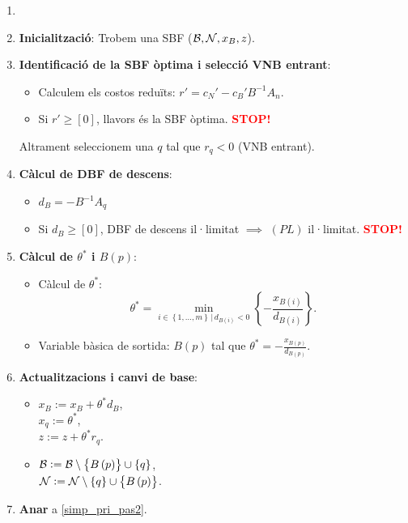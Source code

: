 \begin{alg}
    \begin{enumerate}
        \item[]
        \item {\bf Inicialització}: Trobem una SBF ($\mathcal{B}, \mathcal{N}, x_B, z$).
        \item \label{simp_pri_pas2} {\bf Identificació de la SBF òptima i selecció VNB entrant}:
            \begin{itemize}
                \item Calculem els costos reduïts: $r' = c_N' - c_B'B^{-1}A_n$.
                \item Si $r' \geq \left[0\right]$, llavors és la SBF òptima. \textcolor{red}{\bf STOP!}
            \end{itemize}
            Altrament seleccionem una $q$ tal que $r_q < 0$ (VNB entrant).
        \item {\bf Càlcul de DBF de descens}:
            \begin{itemize}
                \item $d_B = -B^{-1}A_q$
                \item Si $d_B \geq \left[0\right]$, DBF de descens il·limitat $\implies$ $\left(PL\right)$ il·limitat. \textcolor{red}{\bf STOP!}
            \end{itemize}
        \item {\bf Càlcul de $\theta^*$ i $B\left(p\right)$}:
            \begin{itemize}
                \item Càlcul de $\theta^*$: 
                    \[\theta^* = \min_{i \in \left\{ 1, \dots, m \right\} \,|\, d_{B\left(i\right)} < 0} \left\{-\frac{x_{B\left(i\right)}}{d_{B\left(i\right)}} \right\}.\]
                \item Variable bàsica de sortida: $B\left(p\right)$ tal que $\theta^* = -\frac{x_{B\left(p\right)}}{d_{B\left(p\right)}}$.
            \end{itemize}
        \item {\bf Actualitzacions i canvi de base}:
            \begin{itemize}
                \item $x_B := x_B + \theta^*d_B$, \\
                    $x_q := \theta^*$, \\
                    $z := z + \theta^* r_q$.
                \item $\mathcal{B} := \mathcal{B} \setminus \left\{B\left(p\right)\right\} \cup \left\{q\right\}$, \\
                    $\mathcal{N} := \mathcal{N} \setminus \left\{q\right\} \cup \left\{B\left(p\right)\right\}$.
            \end{itemize}
        \item {\bf Anar} a \ref{simp_pri_pas2}.
    \end{enumerate}
\end{alg}

